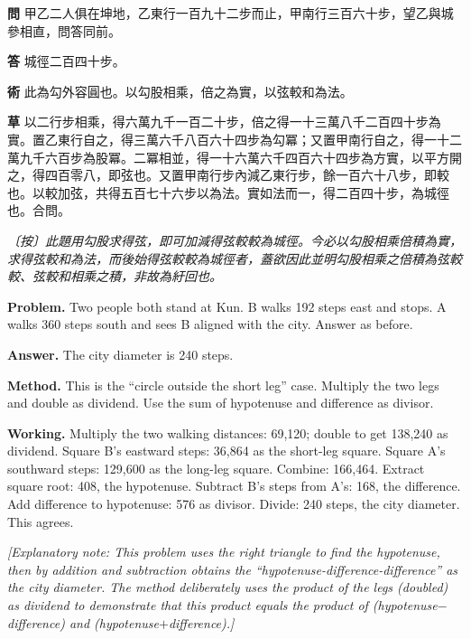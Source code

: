 \documentclass[11pt,a4paper]{article}
\newlength{\chwidth}
\newlength{\enwidth}
\newcommand{\zh}[1]{{\CJKfamily{sf}#1}}
\newenvironment{bilingual}{%
  \noindent
  \begin{minipage}[t]{\chwidth}%
  \small
}{%
  \end{minipage}%
}
\newcommand{\switchcolumn}{%
  \end{minipage}%
  \hfill%
  \begin{minipage}[t]{\enwidth}%
  \small
}
\begin{document}
\begin{bilingual}
\noindent\textbf{\zh{問}} \zh{甲乙二人俱在坤地，乙東行一百九十二步而止，甲南行三百六十步，望乙與城參相直，問答同前。}

\vspace{0.2cm}
\noindent\textbf{\zh{答}} \zh{城徑二百四十步。}

\vspace{0.2cm}
\noindent\textbf{\zh{術}} \zh{此為勾外容圓也。以勾股相乘，倍之為實，以弦較和為法。}

\vspace{0.2cm}
\noindent\textbf{\zh{草}} \zh{以二行步相乘，得六萬九千一百二十步，倍之得一十三萬八千二百四十步為實。置乙東行自之，得三萬六千八百六十四步為勾冪；又置甲南行自之，得一十二萬九千六百步為股冪。二冪相並，得一十六萬六千四百六十四步為方實，以平方開之，得四百零八，即弦也。又置甲南行步內減乙東行步，餘一百六十八步，即較也。以較加弦，共得五百七十六步以為法。實如法而一，得二百四十步，為城徑也。合問。}

\vspace{0.2cm}
\noindent\textit{\zh{〔按〕此題用勾股求得弦，即可加減得弦較較為城徑。今必以勾股相乘倍積為實，求得弦較和為法，而後始得弦較較為城徑者，蓋欲因此並明勾股相乘之倍積為弦較較、弦較和相乘之積，非故為紆回也。}}

\switchcolumn

\noindent\textbf{Problem.} Two people both stand at Kun. B walks 192 steps east and stops. A walks 360 steps south and sees B aligned with the city. Answer as before.

\vspace{0.2cm}
\noindent\textbf{Answer.} The city diameter is 240 steps.

\vspace{0.2cm}
\noindent\textbf{Method.} This is the ``circle outside the short leg'' case. Multiply the two legs and double as dividend. Use the sum of hypotenuse and difference as divisor.

\vspace{0.2cm}
\noindent\textbf{Working.} Multiply the two walking distances: 69,120; double to get 138,240 as dividend. Square B's eastward steps: 36,864 as the short-leg square. Square A's southward steps: 129,600 as the long-leg square. Combine: 166,464. Extract square root: 408, the hypotenuse. Subtract B's steps from A's: 168, the difference. Add difference to hypotenuse: 576 as divisor. Divide: 240 steps, the city diameter. This agrees.

\vspace{0.2cm}
\noindent\textit{[Explanatory note: This problem uses the right triangle to find the hypotenuse, then by addition and subtraction obtains the ``hypotenuse-difference-difference'' as the city diameter. The method deliberately uses the product of the legs (doubled) as dividend to demonstrate that this product equals the product of (hypotenuse$-$difference) and (hypotenuse$+$difference).]}
\end{bilingual}
\end{document}
